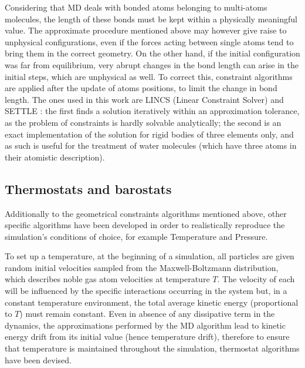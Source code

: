 Considering that MD deals with bonded atoms belonging to multi-atoms molecules, the length of these bonds must be kept within a physically meaningful value. The approximate procedure mentioned above may however give raise to unphysical configurations, even if the forces acting between single atoms tend to bring them in the correct geometry. On the other hand, if the initial configuration was far from equilibrium, very abrupt changes in the bond length can arise in the initial steps, which are unphysical as well.
%
To correct this, constraint algorithms are applied after the update of atoms positions, to limit the change in bond length. The ones used in this work are LINCS (Linear Constraint Solver) \citep{Hess1997} and SETTLE \citep{Miyamoto1992}: the first finds a solution iteratively within an approximation tolerance, as the problem of constraints is hardly solvable analytically; the second is an exact implementation of the solution for rigid bodies of three elements only, and as such is useful for the treatment of water molecules (which have three atoms in their atomistic description).

\subsection{Thermostats and barostats}
Additionally to the geometrical constraints algorithms mentioned above, other specific algorithms have been developed in order to realistically reproduce the simulation's conditions of choice, for example Temperature and Pressure.

To set up a temperature, at the beginning of a simulation, all particles are given random initial velocities sampled from the Maxwell-Boltzmann distribution, which describes noble gas atom velocities at temperature $T$. The velocity of each will be influenced by the specific interactions occurring in the system but, in a constant temperature environment, the total average kinetic energy (proportional to $T$) must remain constant.
%
Even in absence of any dissipative term in the dynamics, the approximations performed by the MD algorithm lead to kinetic energy drift from its initial value (hence temperature drift), therefore to ensure that temperature is maintained throughout the simulation, thermostat algorithms have been devised.

